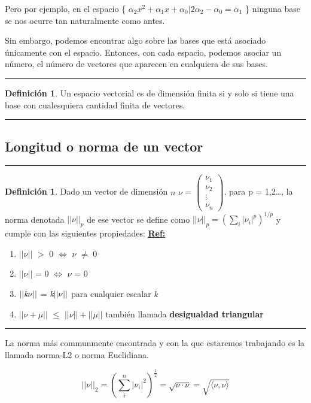 \documentclass[11pt]{article}
\newcommand{\norma}[1]{\lvert\lvert#1\lvert\rvert}
\newcommand{\citar}[1]{\textbf{\underline{Ref:}} \cite{#1}}
\theoremstyle{definition}
\newtheorem{definicion}[defn]{Definición}
\begin{document}
\noindent Pero por ejemplo, en el espacio \{ $\alpha_2x^2 + \alpha_1x + \alpha_0 \lvert 2\alpha_2 - \alpha_0 = \alpha_1$ \} ninguna base se nos ocurre tan naturalmente como antes.

Sin embargo, podemos encontrar algo sobre las bases que est\'{a} asociado \'{u}nicamente con el espacio. Entonces, con cada espacio, podemos asociar un n\'{u}mero, el n\'{u}mero de vectores que aparecen en cualquiera de sus bases.
\\
\hrule
\begin{definicion}
Un espacio vectorial es de dimensi\'{o}n finita si y solo si tiene una base con cualesquiera cantidad finita de vectores.
\end{definicion}
\hrule

\pagebreak
\subsection*{Longitud o norma de un vector}
\vspace{10mm}
\hrule
\begin{definicion}\label{def:Norma}
	Dado un vector de dimensión $n$ $\nu$ = $\left(\begin{array}{c} \nu_1 \\\nu_2\\\vdots\\\nu_n\end{array}\right)$, para p = 1,2\dots, la norma denotada $\norma{\nu}_p$ de ese vector se define como $\norma{\nu}_p = (\displaystyle\sum_{i}\lvert{\nu_i}\rvert^p)^{1/p}$ y cumple con las siguientes propiedades: \citar{Gradshteyn}

	\begin{enumerate}
		\item $\norma{\nu}$ $>$ 0 $\Leftrightarrow$ $\nu$ $\neq$ 0 
		\item $\norma{\nu}$ = 0 $\Leftrightarrow$ $\nu$ = 0 
		\item $\norma{\emph{k}\nu}$ = $ \emph{k} \norma{\nu}$ para cualquier escalar \emph{k}
		\item $\norma{\nu+\mu}$ $\leq$ $\norma{\nu}+\norma{\mu}$ también llamada \textbf{desigualdad triangular}
	\end{enumerate}
\end{definicion}
\hrule

\noindent La norma más communmente encontrada y con la que estaremos trabajando es la llamada norma-L2 o norma Euclidiana.

\begin{equation}
	\norma{\nu}_2 = (\displaystyle\sum_{i}^n\lvert{\nu_i}\rvert^2)^\frac{1}{2} =  \sqrt{\nu\cdot\nu} = \sqrt{\langle\nu,\nu\rangle} 
\end{equation}
\end{document}
